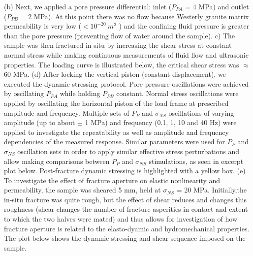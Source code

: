 \documentclass[letterpaper,10pt]{article}
\begin{document}
(b) Next, we applied a pore pressure differential: inlet ($P_{PA}$ = 4 MPa) and outlet ($P_{PB}$ = 2 MPa). At this point there was no flow because Westerly granite matrix permeability is very low ($< 10^{-20}\ m^2$ ) and the confining fluid pressure is greater than the pore pressure (preventing flow of water around the sample).
c) The sample was then fractured in situ by increasing the shear stress at constant normal stress while making continuous measurements of fluid flow and ultrasonic properties. The loading curve is illustrated below, the critical shear stress was $ \approx $60 MPa. 
(d) After locking the vertical piston (constant displacement), we executed the dynamic stressing protocol. Pore pressure oscillations were achieved by oscillating $P_{PA}$ while holding $P_{PB}$ constant. Normal stress oscillations were applied by oscillating the horizontal piston of the load frame at prescribed amplitude and frequency. Multiple sets of $P_{P}$ and $ \sigma_{NS} $ oscillations of varying amplitude (up to about $ \pm $ 1 MPa) and frequency (0.1, 1, 10 and 40 Hz) were applied to investigate the repeatability as well as amplitude and frequency dependencies of the measured response. Similar parameters were used for $P_{P}$ and $ \sigma_{NS} $ oscillation sets in order to apply similar effective stress perturbations and allow making comparisons between $P_{P}$ and $ \sigma_{NS} $ stimulations, as seen in excerpt plot below. Post-fracture dynamic stressing is highlighted with a yellow box. 
(e) To investigate the effect of fracture aperture on elastic nonlinearity and permeability, the sample was sheared 5 mm, held at $ \sigma_{NS} $ = 20 MPa. Initially,the in-situ fracture was quite rough, but the effect of shear reduces and changes this roughness (shear changes the number of fracture asperities in contact and extent to which the two halves were mated) and thus allows for investigation of how fracture aperture is related to the elasto-dyamic and hydromechanical properties. The plot below shows the dynamic stressing and shear sequence imposed on the sample.

\newpage
\end{document}

